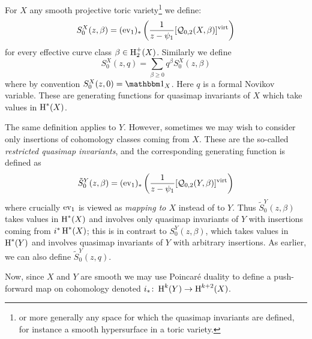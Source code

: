 For $X$ any smooth projective toric variety\footnote{or more generally any space for which the quasimap invariants are defined, for instance a smooth hypersurface in a toric variety.} we define: 
\begin{equation*} S_0^X(z,\beta)=(\operatorname{ev}_1)_*\left(\frac{1}{z-\psi_1} [\mathcal{Q}_{0,2}(X,\beta)]^{\operatorname{virt}}\right) \end{equation*}
for every effective curve class $\beta\in \operatorname{H}_2^+(X)$. Similarly we define
\begin{equation*} S_0^X(z,q)=\sum_{\beta\geq 0} q^\beta S_0^X(z,\beta)\end{equation*}
where by convention $S_0^X(z,0)= \mathbbm 1_X$. Here $q$ is a formal Novikov variable. These are generating functions for quasimap invariants of $X$ which take values in $\operatorname{H}^*(X)$.

The same definition applies to $Y$. However, sometimes we may wish to consider only insertions of cohomology classes coming from $X$. These are the so-called \emph{restricted quasimap invariants}, and the corresponding generating function is defined as
\begin{equation*} \tilde{S}^Y_0(z,\beta) = (\operatorname{ev}_1)_* \left( \dfrac{1}{z-\psi_1} [\mathcal{Q}_{0,2}(Y,\beta)]^{\operatorname{virt}} \right) \end{equation*}
where crucially $\operatorname{ev}_1$ is viewed as \emph{mapping to $X$} instead of to $Y$. Thus $\tilde{S}^Y_0(z,\beta)$ takes values in $\operatorname{H}^*(X)$ and involves only quasimap invariants of $Y$ with insertions coming from $i^*\operatorname{H}^*(X)$; this is in contrast to $S^Y_0(z,\beta)$, which takes values in $\operatorname{H}^*(Y)$ and involves quasimap invariants of $Y$ with arbitrary insertions. As earlier, we can also define $\tilde{S}_0^Y(z,q)$.

Now, since $X$ and $Y$ are smooth we may use Poincar\'{e} duality to define a push-forward map on cohomology denoted $i_* \colon \operatorname{H}^k(Y) \rightarrow \operatorname{H}^{k+2}(X)$.

